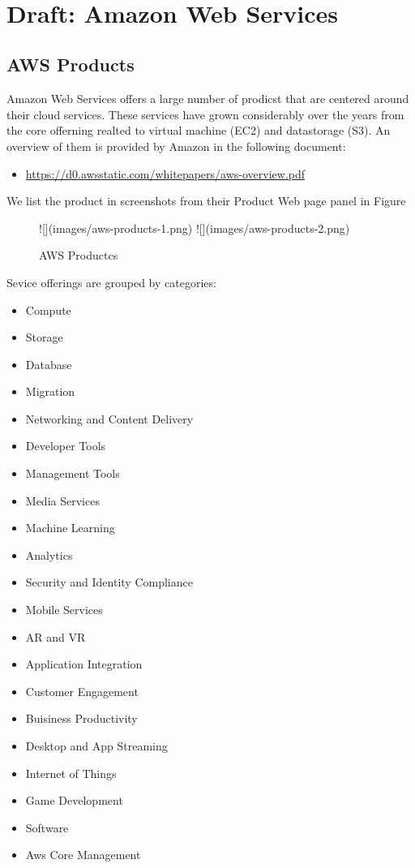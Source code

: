 \MDNAME\

\section{Draft: Amazon Web Services}

\label{s:aws} 

\subsection{AWS Products}

Amazon Web Services offers a large number of prodicst that are centered
around their cloud services. These services have grown considerably over
the years from the core offerning realted to virtual machine (EC2) and
datastorage (S3). An overview of them is provided by Amazon in the
following document:

\begin{itemize}
\item
  \url{https://d0.awsstatic.com/whitepapers/aws-overview.pdf}
\end{itemize}

We list the product in screenshots from their Product Web page panel in
Figure \label{F:aws-products}

\begin{figure}
![](images/aws-products-1.png)
![](images/aws-products-2.png)
\caption{AWS Productcs}
\label{F:aws-products}
\end{figure}

Sevice offerings are grouped by categories:

\begin{itemize}
\item
  Compute
\item
  Storage
\item
  Database
\item
  Migration
\item
  Networking and Content Delivery
\item
  Developer Tools
\item
  Management Tools
\item
  Media Services
\item
  Machine Learning
\item
  Analytics
\item
  Security and Identity Compliance
\item
  Mobile Services
\item
  AR and VR
\item
  Application Integration
\item
  Customer Engagement
\item
  Buisiness Productivity
\item
  Desktop and App Streaming
\item
  Internet of Things
\item
  Game Development
\item
  Software
\item
  Aws Core Management
\end{itemize}

